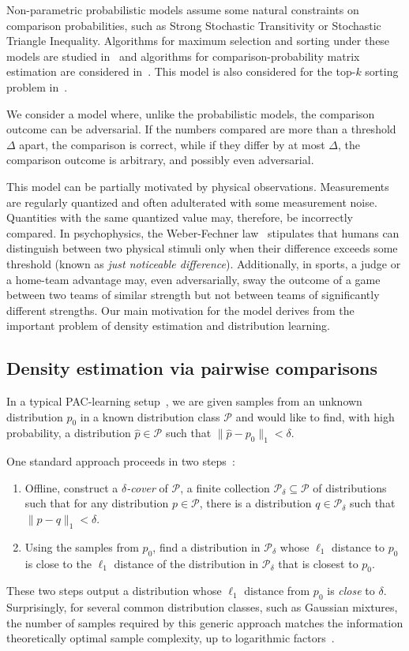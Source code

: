 \documentclass[twoside,11pt]{article}
\newcommand{\cP}{\mathcal{P}}
\newcommand{\thrr}{\Delta}
\newcommand{\deltacover}{\delta}
\begin{document}
Non-parametric probabilistic models assume some natural constraints on
comparison probabilities, such as Strong Stochastic Transitivity or
Stochastic Triangle Inequality. Algorithms for maximum selection and
sorting under these models are studied in~\citet{falahatgar17a,falahatgar17b,falahatgar18,yue11}
and algorithms for comparison-probability matrix estimation are
considered in~\citet{shah16}. This model is also considered for the 
top-$k$ sorting problem in~\citet{chen17a,chen17b}. 


We consider a model where, unlike the probabilistic models, the
comparison outcome can be adversarial.  If the numbers compared are
more than a threshold $\thrr$ apart, the comparison is correct, while
if they differ by at most $\thrr$, the comparison outcome is arbitrary, and
possibly even adversarial.

This model can be partially motivated by physical observations.
Measurements are regularly quantized and often adulterated with
some measurement noise. Quantities with the same quantized value may,
 therefore, be incorrectly compared. In psychophysics, the
Weber-Fechner law~\citep{Ekman59} stipulates that humans can
distinguish between two physical stimuli only when their difference
exceeds some threshold (known as \emph{just
    noticeable difference}).  Additionally, in sports, a judge or a home-team
advantage may, even adversarially, sway the outcome of a game between
two teams of similar strength but not between teams of significantly
different strengths.  Our main motivation for the model
derives from the important problem of density estimation and
distribution learning.

\subsection{Density estimation via pairwise comparisons}
In a typical PAC-learning setup~\citep{Valiant84,KearnsMRRSS94},
we are given samples from an unknown distribution $p_0$ in a
known distribution class $\cP$ and would like to find,
with high probability, a distribution $\hat p\in\cP$ such that
$\|\hat p-p_0\|_1<\deltacover$.

One standard approach proceeds in two steps~\citep{DevroyeL01}:
\begin{enumerate}
\item 
Offline, construct a \emph{$\deltacover$-cover} of $\cP$, a finite
collection $\cP_{\deltacover}\subseteq\cP$ of distributions such that
for any distribution $p\in\cP$, there is a distribution
$q\in\cP_{\deltacover}$ such that $\|p-q\|_1<\deltacover$.
\item
Using the samples from $p_0$, find a distribution in
$\cP_{\deltacover}$ whose $\ell_1$ distance to $p_0$ is close to the
$\ell_1$ distance of the distribution in $\cP_{\deltacover}$ that is
closest to $p_0$.
\end{enumerate}
These two steps output a distribution whose $\ell_1$
distance from $p_0$ is \emph{close} to $\deltacover$.
Surprisingly, for several common distribution classes, such as Gaussian
mixtures, the number of samples required by this generic approach
matches the information theoretically optimal sample complexity,
up to logarithmic factors~\citep{DaskalakisK13, AcharyaJOS14, diako16}.
\end{document}
